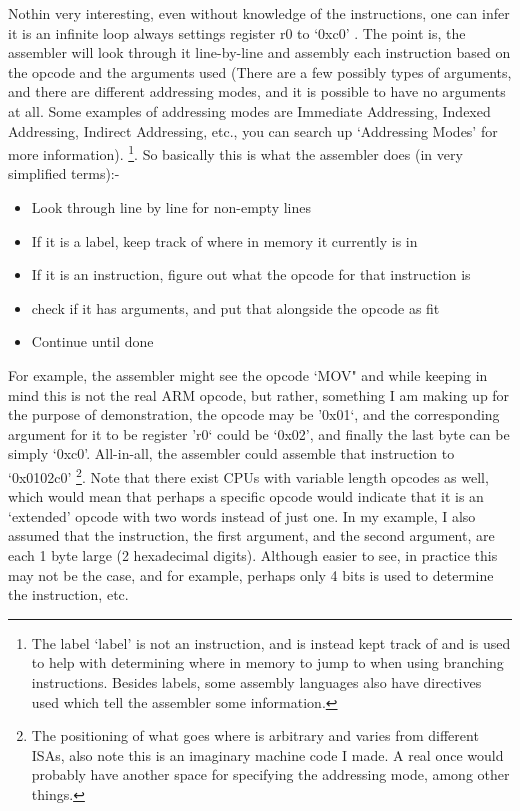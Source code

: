 \documentclass[twocolumn, a4paper,12pt]{article}
\begin{document}
Nothin very interesting, even without knowledge of the instructions, one can infer it is an infinite loop always settings register r0
to `0xc0' . The point is, the assembler will look through it line-by-line and assembly each instruction based on the opcode and the arguments 
used (There are a few possibly types of arguments, and there are different addressing modes, and it is possible to have no arguments at all. Some examples of addressing modes are Immediate Addressing, Indexed Addressing, Indirect Addressing, etc., you can search up `Addressing Modes' for more information). 
\footnote{The label `label' is not an instruction, and is instead kept track of and is used to help with determining
where in memory to jump to when using branching instructions. Besides labels, some assembly languages also have directives
used which tell the assembler some information.}. So basically this is what the assembler does (in very simplified terms):-
\begin{itemize}
	\item  Look through line by line for non-empty lines
	\item If it is a label, keep track of where in memory it currently is in
	\item If it is an instruction, figure out what the opcode for that instruction is
	\item check if it has arguments, and put that alongside the opcode as fit
	\item Continue until done
\end{itemize}
For example, the assembler might see the opcode `MOV" and while keeping in mind this is not the real ARM opcode, but rather, something I
am making up for the purpose of demonstration, the opcode may be '0x01`, and the corresponding argument for it to be register 'r0` could
be `0x02', and finally the last byte can be simply `0xc0'. All-in-all, the assembler could assemble that instruction to `0x0102c0'
\footnote{The positioning of what goes where is arbitrary and varies from different ISAs, also note this is an imaginary
machine code I made. A real once would probably have another space for specifying the addressing mode, among other things.}. Note that there exist CPUs
with variable length opcodes as well, which would mean that perhaps a specific opcode would indicate that it is an `extended' opcode
with two words instead of just one.
In my example, I also assumed that the instruction, the first argument, and the second argument, are each 1 byte large (2 hexadecimal
digits). Although easier to see, in practice this may not be the case, and for example, perhaps only 4 bits is used to determine
the instruction, etc.
\end{document}
